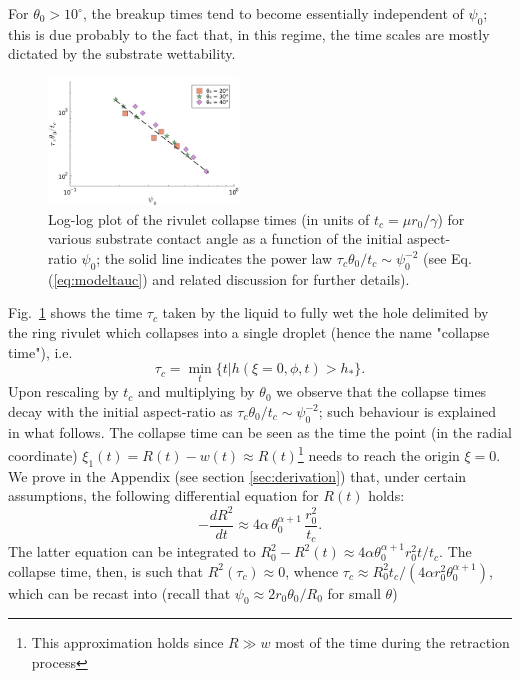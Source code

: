 \documentclass[%
 aip,
 amsmath,amssymb,
 reprint,%
]{revtex4-1}
\begin{document}
For $\theta_0 > 10^{\circ}$, the breakup times tend to become essentially independent of $\psi_0$; this is due probably to the fact that, in this regime, the time scales are mostly dictated by the substrate wettability.\\ 
\begin{figure}
    \centering
    \includegraphics[width = 0.45\textwidth]{psi_0_collapse_thetapow1.pdf}
    \caption{Log-log plot of the rivulet collapse times (in units of $t_c = \mu r_0/\gamma$) for various substrate contact angle as a function of the initial aspect-ratio $\psi_0$; the solid line indicates the power law 
    $\tau_c \theta_0/t_c \sim \psi_0^{-2}$ (see Eq.(\ref{eq:modeltauc}) and related discussion for further details).}
    \label{fig:collapsetimes}
\end{figure}
Fig.~\ref{fig:collapsetimes} shows the time $\tau_c$ taken by the liquid to fully wet the hole delimited by the ring rivulet which collapses into a single droplet (hence the name "collapse time"), i.e. 
\begin{equation}\label{eq:collapsetime}
    \tau_c = \min_t \{t | h(\xi=0,\phi,t) > h_{\ast}\}.
\end{equation}
Upon rescaling by $t_c$ and multiplying by $\theta_0$ we observe that the collapse times decay with the initial aspect-ratio as $\tau_c \theta_0/t_c \sim \psi_0^{-2}$; such behaviour is explained in what follows.
The collapse time can be seen as the time the point (in the radial coordinate) $\xi_1(t) = R(t) - w(t) \approx R(t)$\footnote{This approximation holds since $R \gg w$ most of the time during the retraction process} needs to reach the origin $\xi = 0$. 
We prove in the Appendix (see section \ref{sec:derivation}) that, under certain assumptions, the following differential equation for $R(t)$ holds:
\begin{equation}\label{eq:modelC4}
    -\frac{d R^2}{dt} \approx 4\alpha \, \theta_0^{\alpha+1} \, \frac{r_0^2}{t_c}.
\end{equation}
The latter equation can be integrated to $R_0^2 - R^2(t) \approx 4 \alpha \theta_0^{\alpha +1} r_0^2 t/t_c$.
The collapse time, then, is such that $R^2(\tau_c) \approx 0$, whence $\tau_c  \approx R_0^2 t_c/(4 \alpha r_0^2 \theta_0^{\alpha+1})$, which can be recast into (recall that $\psi_0 \approx 2 r_0 \theta_0/R_0$ for small $\theta$) 
\end{document}
